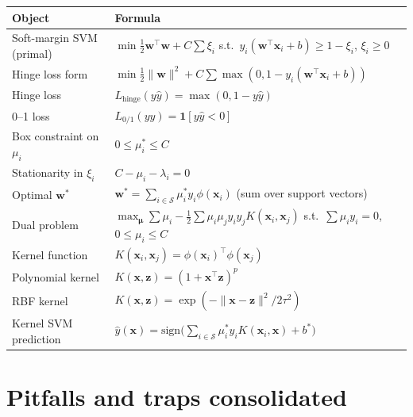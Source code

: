 \documentclass[11pt, a4paper]{article}
\newcommand{\thead}[1]{\textbf{#1}}
\begin{document}
\begin{tabularx}{\linewidth}{@{}lX@{}}
\toprule
\thead{Object} & \thead{Formula} \\
\midrule
Soft-margin SVM (primal)         & $\min \tfrac{1}{2}\mathbf{w}^\top\mathbf{w} + C\sum\xi_i$ s.t.\ $y_i(\mathbf{w}^\top\mathbf{x}_i + b) \ge 1 - \xi_i$, $\xi_i \ge 0$ \\
Hinge loss form                  & $\min \tfrac{1}{2}\|\mathbf{w}\|^2 + C\sum\max(0, 1 - y_i(\mathbf{w}^\top\mathbf{x}_i + b))$ \\
Hinge loss                       & $L_{\text{hinge}}(y\hat y) = \max(0, 1 - y\hat y)$ \\
0--1 loss                        & $L_{0/1}(y\hat y) = \mathbf{1}[y\hat y < 0]$ \\
Box constraint on $\mu_i$        & $0 \le \mu_i^* \le C$ \\
Stationarity in $\xi_i$          & $C - \mu_i - \lambda_i = 0$ \\
Optimal $\mathbf{w}^*$           & $\mathbf{w}^* = \sum_{i\in\mathcal{S}}\mu_i^* y_i \phi(\mathbf{x}_i)$ (sum over support vectors) \\
Dual problem                     & $\max_{\boldsymbol\mu}\sum\mu_i - \tfrac{1}{2}\sum\mu_i\mu_j y_i y_j K(\mathbf{x}_i, \mathbf{x}_j)$ s.t.\ $\sum \mu_i y_i = 0$, $0 \le \mu_i \le C$ \\
Kernel function                  & $K(\mathbf{x}_i, \mathbf{x}_j) = \phi(\mathbf{x}_i)^\top\phi(\mathbf{x}_j)$ \\
Polynomial kernel                & $K(\mathbf{x}, \mathbf{z}) = (1 + \mathbf{x}^\top\mathbf{z})^p$ \\
RBF kernel                       & $K(\mathbf{x}, \mathbf{z}) = \exp(-\|\mathbf{x}-\mathbf{z}\|^2 / 2\tau^2)$ \\
Kernel SVM prediction            & $\hat y(\mathbf{x}) = \mathrm{sign}\big(\sum_{i\in\mathcal{S}}\mu_i^* y_i K(\mathbf{x}_i, \mathbf{x}) + b^*\big)$ \\
\bottomrule
\end{tabularx}

\section*{Pitfalls and traps consolidated}
\end{document}
